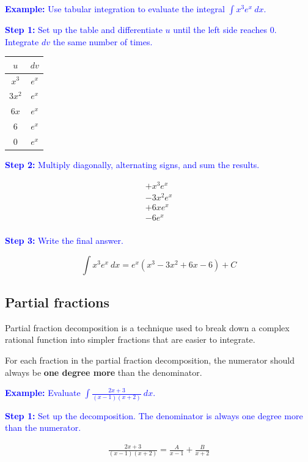 \documentclass[letterpaper, 12pt]{article}
\newcommand{\example}[1]{\textcolor{blue}{\textbf{Example:} #1}}
\newcommand{\step}[2]{\textcolor{blue}{\textbf{Step #1:} #2}}
\begin{document}
\example{Use tabular integration to evaluate the integral $\displaystyle \int x^3 e^x \: dx$.}

\step{1}{Set up the table and differentiate $u$ until the left side reaches 0. Integrate $dv$ the same number of times.}

\begin{table}[H]
\centering
\begin{tabular}{|c|c|}
\hline
$u$ & $dv$ \\
\hline
$x^3$ & $e^x$ \\
$3x^2$ & $e^x$ \\
$6x$ & $e^x$ \\
$6$ & $e^x$ \\
$0$ & $e^x$ \\
\hline
\end{tabular}
\end{table}

\step{2}{Multiply diagonally, alternating signs, and sum the results.}

\begin{gather*}
+ x^3 e^x \\
- 3x^2 e^x \\
+ 6x e^x \\
- 6 e^x \\
\end{gather*}

\step{3}{Write the final answer.}

$$\int x^3 e^x \: dx = \boxed{e^x (x^3 - 3x^2 + 6x - 6) + C}$$

\subsection*{Partial fractions}

Partial fraction decomposition is a technique used to break down a complex rational function into simpler fractions that are easier to integrate.

For each fraction in the partial fraction decomposition, the numerator should always be \textbf{one degree more} than the denominator.

\example{Evaluate $\displaystyle \int \frac{2x + 3}{(x-1)(x+2)} \: dx$.}

\step{1}{Set up the decomposition. The denominator is always one degree more than the numerator.}

\begin{gather*}
\frac{2x + 3}{(x-1)(x+2)} = \frac{A}{x-1} + \frac{B}{x+2}
\end{gather*}
\end{document}
